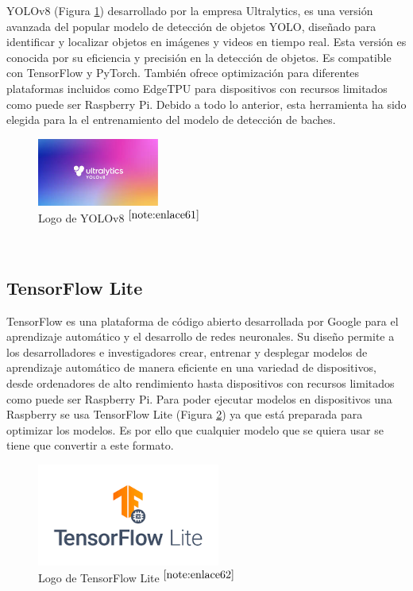 \acs{YOLO}v8 (Figura \ref{fig:yolov8}) desarrollado por la empresa Ultralytics, es una versión avanzada del popular modelo de detección de objetos \ac{YOLO}, diseñado para identificar y localizar objetos en imágenes y videos en tiempo real. Esta versión es conocida por su eficiencia y precisión en la detección de objetos. Es compatible con TensorFlow y PyTorch. También ofrece optimización para diferentes plataformas incluidos como EdgeTPU para dispositivos con recursos limitados como puede ser Raspberry Pi. Debido a todo lo anterior, esta herramienta ha sido elegida para la el entrenamiento del modelo de detección de baches. 

\begin{figure} [h!]
	\begin{center}
		\includegraphics[width=4cm]{figs/yolov8.png}
	\end{center}
	\caption{Logo de YOLOv8 $^{\ref{note:enlace61}}$} 
	\label{fig:yolov8}
\end{figure}\

\setcounter{footnote}{61} %


\subsection{TensorFlow Lite}

TensorFlow es una plataforma de código abierto desarrollada por Google para el aprendizaje automático y el desarrollo de redes neuronales. Su diseño permite a los desarrolladores e investigadores crear, entrenar y desplegar modelos de aprendizaje automático de manera eficiente en una variedad de dispositivos, desde ordenadores de alto rendimiento hasta dispositivos con recursos limitados como puede ser Raspberry Pi. Para poder ejecutar modelos en dispositivos una Raspberry se usa TensorFlow Lite (Figura \ref{fig:tflite}) ya que está preparada para optimizar los modelos. Es por ello que cualquier modelo que se quiera usar se tiene que convertir a este formato. 

\begin{figure} [h!]
	\begin{center}
		\includegraphics[width=6cm]{figs/tflite.png}
	\end{center}
	\caption{Logo de TensorFlow Lite $^{\ref{note:enlace62}}$} 
	\label{fig:tflite}
\end{figure}\

